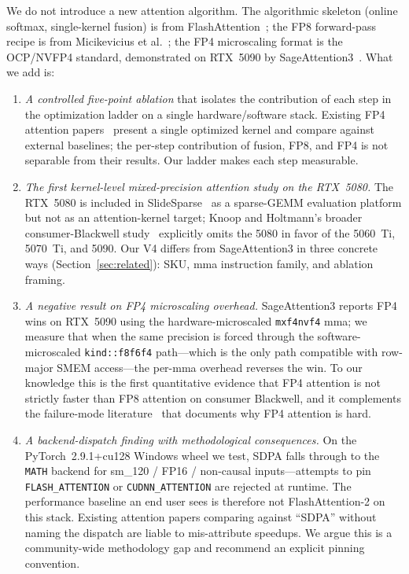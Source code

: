 \documentclass[conference]{IEEEtran}
\begin{document}
We do not introduce a new attention algorithm. The algorithmic
skeleton (online softmax, single-kernel fusion) is from
FlashAttention~\cite{dao2022flashattention}; the FP8 forward-pass
recipe is from Micikevicius et al.~\cite{micikevicius2022fp8}; the FP4
microscaling format is the OCP/NVFP4 standard, demonstrated on RTX~5090
by SageAttention3~\cite{zhang2025sageattention3}. What we add is:

\begin{enumerate}
  \item \emph{A controlled five-point ablation} that isolates the
        contribution of each step in the optimization ladder on a
        single hardware/software stack. Existing FP4 attention
        papers~\cite{zhang2025sageattention3,zhang2026attnqat} present
        a single optimized kernel and compare against external
        baselines; the per-step contribution of fusion, FP8, and FP4
        is not separable from their results. Our ladder makes each
        step measurable.
  \item \emph{The first kernel-level mixed-precision attention study
        on the RTX~5080.} The RTX~5080 is included in
        SlideSparse~\cite{shao2026slidesparse} as a sparse-GEMM
        evaluation platform but not as an attention-kernel target;
        Knoop and Holtmann's broader consumer-Blackwell
        study~\cite{knoop2026consumerllm} explicitly omits the 5080
        in favor of the 5060~Ti, 5070~Ti, and 5090. Our V4 differs
        from SageAttention3 in three concrete ways
        (Section~\ref{sec:related}): SKU, mma instruction family, and
        ablation framing.
  \item \emph{A negative result on FP4 microscaling overhead.}
        SageAttention3 reports FP4 wins on RTX~5090 using the
        hardware-microscaled \texttt{mxf4nvf4} mma; we measure that
        when the same precision is forced through the
        software-microscaled \texttt{kind::f8f6f4} path---which is
        the only path compatible with row-major SMEM access---the
        per-mma overhead reverses the win. To our knowledge this is
        the first quantitative evidence that FP4 attention is not
        strictly faster than FP8 attention on consumer Blackwell, and
        it complements the failure-mode literature~%
        \cite{zhang2026attnqat,qiu2025lowprecisionfails,zhang2026snapmla}
        that documents why FP4 attention is hard.
  \item \emph{A backend-dispatch finding with methodological
        consequences.} On the PyTorch~2.9.1+cu128 Windows wheel we
        test, SDPA falls through to the \texttt{MATH} backend for
        sm\_120 / FP16 / non-causal inputs---attempts to pin
        \texttt{FLASH\_ATTENTION} or \texttt{CUDNN\_ATTENTION} are
        rejected at runtime. The performance baseline an end user sees
        is therefore not FlashAttention-2 on this stack. Existing
        attention papers comparing against ``SDPA'' without naming the
        dispatch are liable to mis-attribute speedups. We argue this
        is a community-wide methodology gap and recommend an explicit
        pinning convention.
\end{enumerate}
\end{document}
